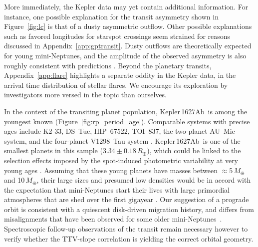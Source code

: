 \documentclass[12pt,modern,twocolumn,tighten]{aastex63}
\newcommand{\pn}{Kepler\,1627Ab} %
\begin{document}
More immediately, the Kepler data may yet contain additional
information.  For instance, one possible explanation for the transit
asymmetry shown in Figure~\ref{fig:lc} is that of a dusty asymmetric
outflow.  Other possible explanations such as favored longitudes for
starspot crossings seem strained for reasons discussed in
Appendix~\ref{app:gptransit}.  Dusty outflows are theoretically
expected for young mini-Neptunes, and the amplitude of the observed
asymmetry is also roughly consistent with predictions
\citep{wang_dai_2019}.  Beyond the planetary transits,
Appendix~\ref{app:flare} highlights a separate oddity in the Kepler
data, in the arrival time distribution of stellar flares.  We
encourage its exploration by investigators more versed in the topic
than ourselves.

In the context of the transiting planet population, \pn\ is among the
youngest known (Figure~\ref{fig:rp_period_age}).  Comparable systems
with precise ages include K2-33, DS~Tuc, HIP~67522,
TOI~837, the two-planet AU~Mic system, and the four-planet V1298~Tau
system
\citep{Mann_K2_33b_2016,David_et_al_2017,newton_tess_2019,david_four_2019,bouma_cluster_2020,plavchan_planet_2020,martioli_aumicbc_2021}.
\pn\ is one of the smallest planets in this sample ($3.34\pm
0.18\,R_\oplus$), which could be linked to the selection effects
imposed by the spot-induced photometric variability at very young ages
\citep[{\it e.g.},][]{zhou_2021_tois}.  Assuming that these young
planets have masses between $\approx$5$\,M_\oplus$ and 10$\,M_\oplus$,
their large sizes and presumed low densities would be in accord with
the expectation that mini-Neptunes start their lives with large
primordial atmospheres that are shed over the first gigayear
\citep{Owen_Wu_2013,Fulton_et_al_2017,ginzburg_corepowered_2018}.  Our
suggestion of a prograde orbit is consistent with a quiescent
disk-driven migration history, and differs from misalignments that
have been observed for some older
mini-Neptunes~\citep{sanchis-ojeda_starspots_2011,albrecht_obliquities_2012,dalal_2019_hd3167,rubenzahl_tess-keck_2021}.
Spectroscopic follow-up observations of the transit remain necessary
however to verify whether the TTV-slope correlation is yielding the
correct orbital geometry.

\end{document}
